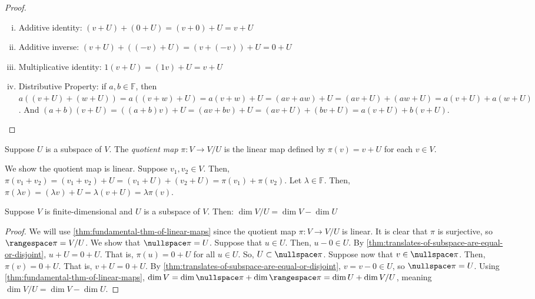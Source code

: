\documentclass{article}
\begin{document}
\begin{proof}
\begin{enumerate}[(i)]
  \item Additive identity: $(v + U) + (0 + U) = (v + 0) + U = v + U$
  \item Additive inverse: $(v + U) + ((-v) + U) = (v + (-v)) + U = 0+U$
  \item Multiplicative identity: $1(v + U) = (1v) + U = v + U$
  \item Distributive Property:
    if $a, b \in \mathbb{F}$, then $a((v + U) + (w + U)) = a((v + w) +
    U) = a(v + w) + U = (av + aw) + U = (av + U) + (aw + U) = a(v + U)
    + a(w + U)$. And $(a + b)(v + U) = ((a + b)v) + U = (av + bv) + U
    = (av + U) + (bv + U) = a(v + U) + b(v + U)$.
  \end{enumerate}
\end{proof}

\begin{definition}
  \label{def:quotient-map}
  Suppose $U$ is a subspace of $V$. The \textit{quotient map} $\pi: V
  \rightarrow V/U$ is the linear map defined by $\pi(v) = v + U$ for
  each $v \in V$.
\end{definition}

\begin{remark}
  We show the quotient map is linear. Suppose $v_1, v_2 \in V$. Then,
  $\pi(v_1 + v_2) = (v_1 + v_2) + U = (v_1 + U) + (v_2 + U) = \pi(v_1)
  + \pi(v_2)$. Let $\lambda \in \mathbb{F}$. Then, $\pi(\lambda v) =
  (\lambda v) + U = \lambda(v + U) = \lambda \pi(v)$.
\end{remark}

\begin{theorem}
  \label{thm:dimension-of-quotient-space}
  Suppose $V$ is finite-dimensional and $U$ is a subspace of
  $V$. Then: $\dim V/U = \dim V - \dim U$
\end{theorem}
\begin{proof}
  We will use \cref{thm:fundamental-thm-of-linear-maps} since the
  quotient map $\pi: V \rightarrow V/U$ is linear. It is clear that
  $\pi$ is surjective, so $\rangespace \pi = V/U$. We show that
  $\nullspace \pi = U$. Suppose that $u \in U$. Then, $u - 0 \in
  U$. By \cref{thm:translates-of-subspace-are-equal-or-disjoint}, $u +
  U = 0 + U$. That is, $\pi(u) = 0 + U$ for all $u \in U$. So, $U
  \subset \nullspace \pi$. Suppose now that $v \in \nullspace \pi$. Then,
  $\pi(v) = 0 + U$. That is, $v + U = 0 + U$. By
  \cref{thm:translates-of-subspace-are-equal-or-disjoint}, $v = v - 0
  \in U$, so $\nullspace \pi = U$. Using
  \cref{thm:fundamental-thm-of-linear-maps}, $\dim V = \dim \nullspace
  \pi + \dim \rangespace \pi = \dim U + \dim V/U$, meaning $\dim V/U =
  \dim V - \dim U$.
\end{proof}
\end{document}

